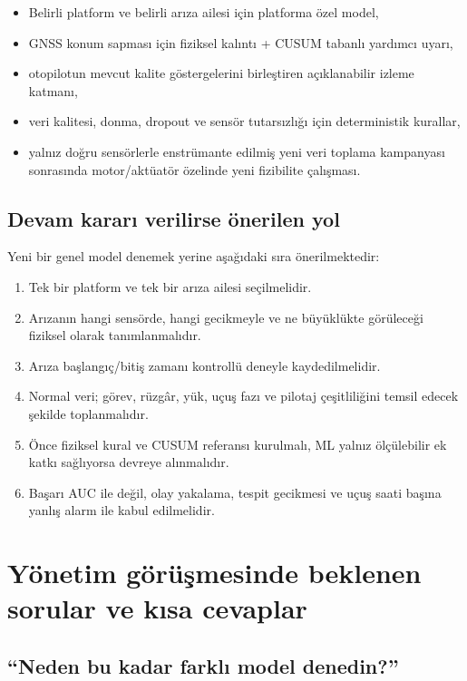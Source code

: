\documentclass[11pt,a4paper]{article}
\begin{document}
\begin{itemize}
  \item Belirli platform ve belirli arıza ailesi için platforma özel model,
  \item GNSS konum sapması için fiziksel kalıntı + CUSUM tabanlı yardımcı uyarı,
  \item otopilotun mevcut kalite göstergelerini birleştiren açıklanabilir izleme katmanı,
  \item veri kalitesi, donma, dropout ve sensör tutarsızlığı için deterministik kurallar,
  \item yalnız doğru sensörlerle enstrümante edilmiş yeni veri toplama kampanyası
  sonrasında motor/aktüatör özelinde yeni fizibilite çalışması.
\end{itemize}

\subsection{Devam kararı verilirse önerilen yol}

Yeni bir genel model denemek yerine aşağıdaki sıra önerilmektedir:

\begin{enumerate}
  \item Tek bir platform ve tek bir arıza ailesi seçilmelidir.
  \item Arızanın hangi sensörde, hangi gecikmeyle ve ne büyüklükte görüleceği
  fiziksel olarak tanımlanmalıdır.
  \item Arıza başlangıç/bitiş zamanı kontrollü deneyle kaydedilmelidir.
  \item Normal veri; görev, rüzgâr, yük, uçuş fazı ve pilotaj çeşitliliğini
  temsil edecek şekilde toplanmalıdır.
  \item Önce fiziksel kural ve CUSUM referansı kurulmalı, ML yalnız ölçülebilir
  ek katkı sağlıyorsa devreye alınmalıdır.
  \item Başarı AUC ile değil, olay yakalama, tespit gecikmesi ve uçuş saati
  başına yanlış alarm ile kabul edilmelidir.
\end{enumerate}

\section{Yönetim görüşmesinde beklenen sorular ve kısa cevaplar}

\subsection*{``Neden bu kadar farklı model denedin?''}
\end{document}

